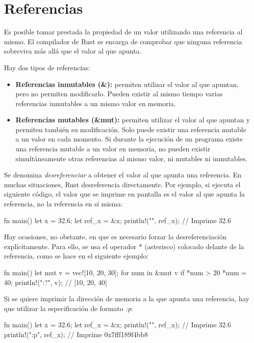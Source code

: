 \section{Referencias}
\noindent Es posible tomar prestada la propiedad de un valor utilizando una referencia al mismo. El compilador de Rust se encarga de comprobar que ninguna referencia sobreviva más allá que el valor al que apunta.

Hay dos tipos de referencias:

\begin{itemize}
   \item \textbf{Referencias inmutables (\&):} permiten utilizar el valor al que apuntan, pero no permiten modificarlo. Pueden existir al mismo tiempo varias referencias inmutables a un mismo valor en memoria.
   \item \textbf{Referencias mutables (\&mut):} permiten utilizar el valor al que apuntan y permiten también su modificación. Solo puede existir una referencia mutable a un valor en cada momento. Si durante la ejecución de un programa existe una referencia mutable a un valor en memoria, no pueden existir simultáneamente otras referencias al mismo valor, ni mutables ni inmutables.
\end{itemize}

Se denomina \textit{desreferenciar} a obtener el valor al que apunta una referencia. En muchas situaciones, Rust desreferencia directamente. Por ejemplo, si ejecuta el siguiente código, el valor que se imprime en pantalla es el valor al que apunta la referencia, no la referencia en sí misma:

\vspace{0.7em}
\begin{Codigo}
fn main() {
   let x = 32.6;
   let ref_x = &x;
   println!("{}", ref_x); // Imprime 32.6
}
\end{Codigo}

Hay ocasiones, no obstante, en que es necesario forzar la desreferenciación explícitamente. Para ello, se usa el operador $*$ (asterisco) colocado delante de la referencia, como se hace en el siguiente ejemplo:

\vspace{0.7em}
\begin{Codigo}
fn main() {
   let mut v = vec![10, 20, 30];
   for num in &mut v {
      if *num > 20 {
         *num = 40;
      }
   }
   println!("{:?}", v); // [10, 20, 40]
}
\end{Codigo}

Si se quiere imprimir la dirección de memoria a la que apunta una referencia, hay que utilizar la especificación de formato \textit{{:p}}:

\vspace{0.7em}
\begin{Codigo}
fn main() {
   let x = 32.6;
   let ref_x = &x;
   println!("{}", ref_x); // Imprime 32.6
   println!("{:p}", ref_x); // Imprime 0x7fff189f4bb8
}
\end{Codigo}



